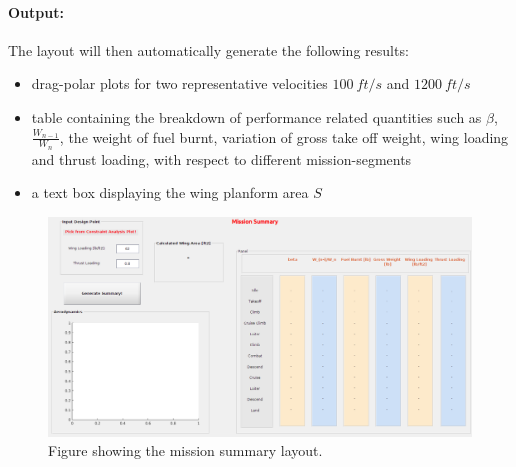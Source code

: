 \documentclass[pdftex,11pt,letter]{article}
\begin{document}
\paragraph{Output:}
The layout will then automatically generate the following results:
\begin{itemize}
\item drag-polar plots for two representative velocities $100~ft/s$ and $1200~ft/s$
\item table containing the breakdown of performance related quantities such as $\beta$, $\frac{W_{n-1}}{W_n}$, the weight of fuel burnt, variation of gross take off weight, wing loading and thrust loading, with respect to different mission-segments

\item a text box displaying the wing planform area $S$
\end{itemize}
\begin{figure}[h!]
	\centering
	\includegraphics[scale=0.40]{figures/mission_layout.pdf}
	\caption{Figure showing the mission summary layout.}
	\label{mission_layout}
\end{figure}
\end{document}
